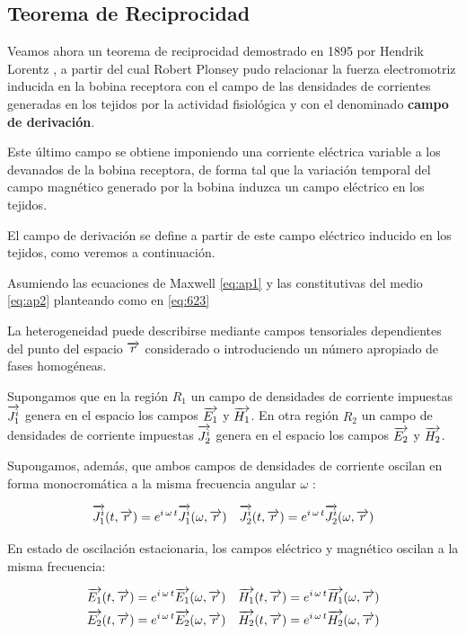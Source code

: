 \subsection{Teorema de Reciprocidad}

Veamos ahora un teorema de reciprocidad demostrado en 1895 por Hendrik Lorentz \citep{Papas_1988}, a partir del cual Robert Plonsey \citep{Plonsey_1992} pudo relacionar la fuerza electromotriz inducida en la bobina receptora con el campo de las densidades de corrientes generadas en los tejidos por la actividad fisiológica y con el denominado \textbf{campo de derivación}.

Este último campo se obtiene imponiendo una corriente eléctrica variable a los devanados de la bobina receptora, de forma tal que la variación temporal del campo magnético generado por la bobina induzca un campo eléctrico en los tejidos.

El campo de derivación se define a partir de este campo eléctrico inducido en los tejidos, como veremos a continuación.

Asumiendo las ecuaciones de Maxwell \ref{eq:ap1} y las constitutivas del medio \ref{eq:ap2} planteando como en \ref{eq:623} 

La heterogeneidad puede describirse mediante campos tensoriales dependientes del punto del espacio $\overrightarrow{r}$ considerado o introduciendo un número apropiado de fases homogéneas.

Supongamos que en la región $R_{1}$ un campo de densidades de corriente impuestas $\overrightarrow{J^{i}_{1}}$ genera en el espacio los campos $\overrightarrow{E_{1}}$ y $\overrightarrow{H_{1}}$.
En otra región $R_{2}$ un campo de densidades de corriente impuestas $\overrightarrow{J_{2}^{i}}$ genera en el espacio los campos $\overrightarrow{E_{2}}$ y $\overrightarrow{H_{2}}$.

Supongamos, además, que ambos campos de densidades de corriente oscilan en forma monocromática a la misma frecuencia angular $\omega$ :

\begin{equation}
	\overrightarrow{J_{1}^{i}}(t,\overrightarrow{r}) = e^{i\,\omega\,t}\overrightarrow{J_{1}^{i}}(\omega,\overrightarrow{r}) \quad
	\overrightarrow{J_{2}^{i}}(t,\overrightarrow{r}) = e^{i\,\omega\,t}\overrightarrow{J_{2}^{i}}(\omega,\overrightarrow{r}) 
\end{equation}

En estado de oscilación estacionaria, los campos eléctrico y magnético oscilan a la misma frecuencia:

\begin{equation}
\begin{aligned}
	&\overrightarrow{E_{1}}(t,\overrightarrow{r}) = e^{i\,\omega\,t}\overrightarrow{E_{1}}(\omega,\overrightarrow{r}) \quad
	 \overrightarrow{H_{1}}(t,\overrightarrow{r}) = e^{i\,\omega\,t}\overrightarrow{H_{1}}(\omega,\overrightarrow{r}) \\
	&\overrightarrow{E_{2}}(t,\overrightarrow{r}) = e^{i\,\omega\,t}\overrightarrow{E_{2}}(\omega,\overrightarrow{r}) \quad
	 \overrightarrow{H_{2}}(t,\overrightarrow{r}) = e^{i\,\omega\,t}\overrightarrow{H_{2}}(\omega,\overrightarrow{r}) 
\end{aligned}
\end{equation}

